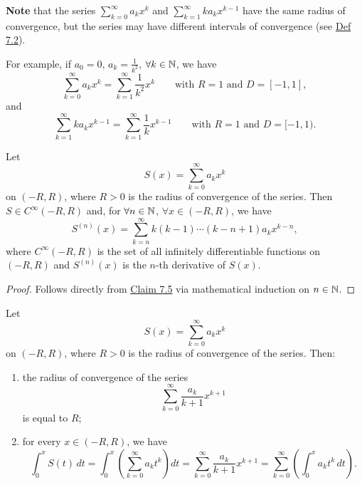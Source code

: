 \textbf{Note} that the series $\sum_{k=0}^{\infty}a_kx^k$ and $\sum_{k=1}^{\infty}ka_kx^{k-1}$ have the same radius of convergence, but the series may have different intervals of convergence (see \hyperref[def:7.2]{Def 7.2}).

For example, if $a_0=0$, $a_k=\frac{1}{k^2}$, $\forall k\in\mathbb{N}$, we have
\[
\sum_{k=0}^{\infty}a_kx^k
=
\sum_{k=1}^{\infty}\frac{1}{k^2}x^k
\qquad\text{with }R=1\text{ and }D=[-1,1],
\]
and
\[
\sum_{k=1}^{\infty}ka_kx^{k-1}
=
\sum_{k=1}^{\infty}\frac{1}{k}x^{k-1}
\qquad\text{with }R=1\text{ and }D=[-1,1).
\]

\begin{claim}\label{claim:7.6}
Let
\[
S(x)=\sum_{k=0}^{\infty}a_kx^k
\]
on $(-R,R)$, where $R>0$ is the radius of convergence of the series.
Then $S\in C^{\infty}(-R,R)$ and, for $\forall n\in\mathbb{N}$, $\forall x\in(-R,R)$, we have
\[
S^{(n)}(x)
=
\sum_{k=n}^{\infty}k(k-1)\cdots(k-n+1)a_kx^{k-n},
\]
where $C^{\infty}(-R,R)$ is the set of all infinitely differentiable functions on $(-R,R)$ and $S^{(n)}(x)$ is the $n$-th derivative of $S(x)$.
\end{claim}

\begin{proof}
Follows directly from \hyperref[claim:7.5]{Claim 7.5} via mathematical induction on $n\in\mathbb{N}$.
\end{proof}

\begin{claim}\label{claim:7.7}
Let
\[
S(x)=\sum_{k=0}^{\infty}a_kx^k
\]
on $(-R,R)$, where $R>0$ is the radius of convergence of the series.
Then:
\begin{enumerate}
    \item\label{item:claim:7.7:1} the radius of convergence of the series
    \[
    \sum_{k=0}^{\infty}\frac{a_k}{k+1}x^{k+1}
    \]
    is equal to $R$;

    \item\label{item:claim:7.7:2} for every $x\in(-R,R)$, we have
    \[
    \int_0^x S(t)\,dt
    =
    \int_0^x\left(\sum_{k=0}^{\infty}a_kt^k\right)dt
    =
    \sum_{k=0}^{\infty}\frac{a_k}{k+1}x^{k+1}
    =
    \sum_{k=0}^{\infty}\left(\int_0^x a_kt^k\,dt\right).
    \tag{4}\label{eq:7:4:1}
    \]
\end{enumerate}
\end{claim}

